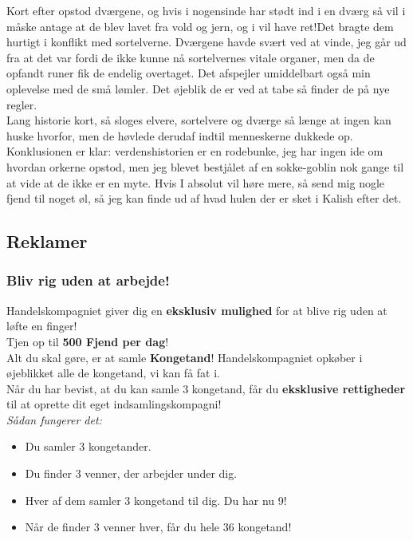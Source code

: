 \documentclass[letterpaper,12pt]{memoir}
\begin{document}
Kort efter opstod dværgene, og hvis i nogensinde har stødt ind i en dværg så vil i måske antage at de blev lavet fra vold og jern, og i vil have ret!Det bragte dem hurtigt i konflikt med sortelverne. Dværgene havde svært ved at vinde, jeg går ud fra at det var fordi de ikke kunne nå sortelvernes vitale organer, men da de opfandt runer fik de endelig overtaget. Det afspejler umiddelbart også min oplevelse med de små lømler. Det øjeblik de er ved at tabe så finder de på nye regler.\\

Lang historie kort, så sloges elvere, sortelvere og dværge så længe at ingen kan huske hvorfor, men de høvlede derudaf indtil menneskerne dukkede op. \\

Konklusionen er klar: verdenshistorien er en rodebunke, jeg har ingen ide om hvordan orkerne opstod, men jeg blevet bestjålet af en sokke-goblin nok gange til at vide at de ikke er en myte. Hvis I absolut vil høre mere, så send mig nogle fjend til noget øl, så jeg kan finde ud af hvad hulen der er sket i Kalish efter det.\\

\newpage
\subsection*{Reklamer}


\subsubsection*{Bliv rig uden at arbejde!}

Handelskompagniet giver dig en \textbf{eksklusiv mulighed} for at blive rig uden at løfte en finger! \\[0.5em]

Tjen op til \textbf{500 Fjend per dag}! \\[0.5em]

Alt du skal gøre, er at samle \textbf{Kongetand}! Handelskompagniet opkøber i øjeblikket alle de kongetand, vi kan få fat i. \\[0.5em]

Når du har bevist, at du kan samle 3 kongetand, får du \textbf{eksklusive rettigheder} til at oprette dit eget indsamlingskompagni! \\[1em]

\textit{Sådan fungerer det:}
\begin{itemize}
  \item Du samler 3 kongetander.
  \item Du finder 3 venner, der arbejder under dig.
  \item Hver af dem samler 3 kongetand til dig. Du har nu 9!
  \item Når de finder 3 venner hver, får du hele 36 kongetand!
\end{itemize}
\end{document}
